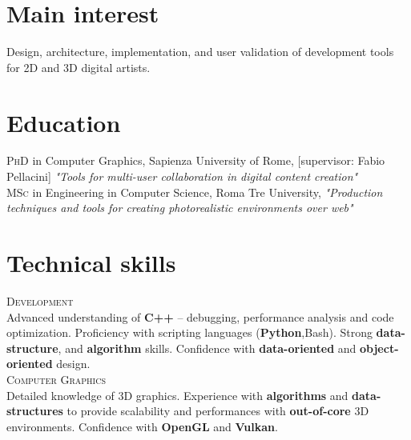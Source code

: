 \documentclass[10pt, a4paper]{article} %
\newcommand{\years}[1]{\marginnote{\scriptsize #1}} %
\begin{document}
\section*{Main interest}

Design, architecture, implementation, and user validation of development tools for 2D and 3D digital artists.


\section*{Education}

\years{2016 - now} \textsc{PhD} in Computer Graphics, Sapienza University of Rome, [supervisor: Fabio Pellacini] \emph{"Tools for multi-user collaboration in digital content creation"}\\ %
\years{2016}\textsc{MSc} in Engineering in Computer Science, Roma Tre University, \emph{"Production techniques and tools for creating photorealistic environments over web"}


\section*{Technical skills}

\textsc{Development}\\
Advanced understanding of \textbf{C++} -- debugging, performance analysis and code optimization. Proficiency with scripting languages (\textbf{Python},Bash). Strong \textbf{data-structure}, and \textbf{algorithm} skills. Confidence with \textbf{data-oriented} and \textbf{object-oriented} design.\\

\textsc{Computer Graphics}\\
Detailed knowledge of 3D graphics. Experience with \textbf{algorithms} and \textbf{data-structures} to provide scalability and performances with \textbf{out-of-core } 3D environments. Confidence with \textbf{OpenGL} and \textbf{Vulkan}.\\
\end{document}
